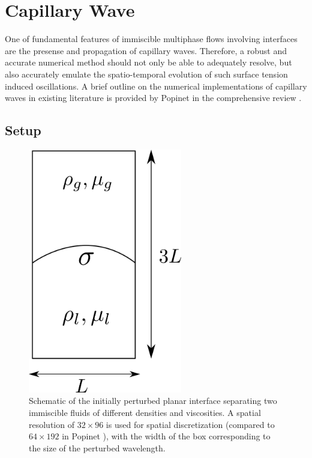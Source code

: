 
\section{Capillary Wave}
One of fundamental features of immiscible multiphase flows involving interfaces are the presense and propagation of capillary waves. Therefore, a robust and accurate numerical method should not only be able to adequately resolve, but also accurately emulate the spatio-temporal evolution of such surface tension induced oscillations. A brief outline on the numerical implementations of capillary waves in existing literature is provided by Popinet in the comprehensive review .

\subsection*{Setup}

\begin{figure}[h!]
    \centering
    \includegraphics[width = 0.6\textwidth]{plots/capwave/config.png}
	\caption{Schematic of the initially perturbed planar interface separating two immiscible fluids of different densities and viscosities. A spatial resolution of $32 \times 96$ is used for spatial discretization (compared to $64 \times 192$ in Popinet \cite{popinet2009accurate}), with the width of the box corresponding to the size of the perturbed wavelength.}
    \label{capwave_conf}
\end{figure}



